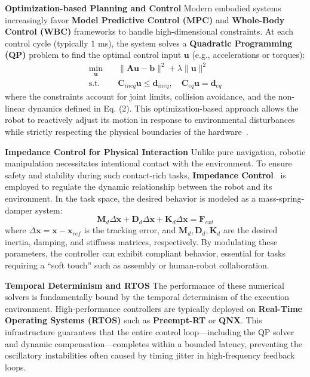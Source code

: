 \documentclass[acmsmall,screen,review,anonymous]{acmart}
\begin{document}
\textbf{Optimization-based Planning and Control} Modern embodied systems increasingly favor \textbf{Model Predictive Control (MPC)} and \textbf{Whole-Body Control (WBC)} frameworks to handle high-dimensional constraints. At each control cycle (typically $1$ ms), the system solves a \textbf{Quadratic Programming (QP)} problem to find the optimal control input $\mathbf{u}$ (e.g., accelerations or torques):
\begin{equation}
    \begin{aligned}
        \min_{\mathbf{u}} \quad & \|\mathbf{A}\mathbf{u} - \mathbf{b}\|^2 + \lambda \|\mathbf{u}\|^2 \\
        \text{s.t.} \quad & \mathbf{C}_{ineq}\mathbf{u} \leq \mathbf{d}_{ineq}, \quad \mathbf{C}_{eq}\mathbf{u} = \mathbf{d}_{eq}
    \end{aligned}
\end{equation}
where the constraints account for joint limits, collision avoidance, and the non-linear dynamics defined in Eq. (2). This optimization-based approach allows the robot to reactively adjust its motion in response to environmental disturbances while strictly respecting the physical boundaries of the hardware~\cite{schulman2014optimizing}.

\textbf{Impedance Control for Physical Interaction} Unlike pure navigation, robotic manipulation necessitates intentional contact with the environment. To ensure safety and stability during such contact-rich tasks, \textbf{Impedance Control}~\cite{hogan1985impedance} is employed to regulate the dynamic relationship between the robot and its environment. In the task space, the desired behavior is modeled as a mass-spring-damper system:
\begin{equation}
    \mathbf{M}_d \Delta \ddot{\mathbf{x}} + \mathbf{D}_d \Delta \dot{\mathbf{x}} + \mathbf{K}_d \Delta \mathbf{x} = \mathbf{F}_{ext}
\end{equation}
where $\Delta \mathbf{x} = \mathbf{x} - \mathbf{x}_{ref}$ is the tracking error, and $\mathbf{M}_d, \mathbf{D}_d, \mathbf{K}_d$ are the desired inertia, damping, and stiffness matrices, respectively. By modulating these parameters, the controller can exhibit compliant behavior, essential for tasks requiring a ``soft touch'' such as assembly or human-robot collaboration.

\textbf{Temporal Determinism and RTOS} The performance of these numerical solvers is fundamentally bound by the temporal determinism of the execution environment. High-performance controllers are typically deployed on \textbf{Real-Time Operating Systems (RTOS)} such as \textbf{Preempt-RT} or \textbf{QNX}. This infrastructure guarantees that the entire control loop—including the QP solver and dynamic compensation—completes within a bounded latency, preventing the oscillatory instabilities often caused by timing jitter in high-frequency feedback loops.
\end{document}
